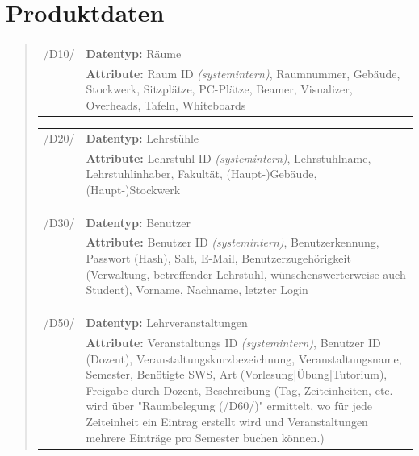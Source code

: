 \section{Produktdaten}
\label{sec:Produktdaten}

\begin{quote}
\begin{tabular}{p{1.5cm}p{14.5cm}}


	 /D10/	& \textbf{Datentyp:} Räume \\
				& \textbf{Attribute:} Raum ID \textsl{(systemintern)}, Raumnummer, Gebäude, Stockwerk, Sitzplätze, PC-Plätze, Beamer, Visualizer, Overheads, Tafeln, Whiteboards  \\[0.25cm]

\end{tabular}


\begin{tabular}{p{1.5cm}p{14.5cm}}
		
	 /D20/	& \textbf{Datentyp:} Lehrstühle \\
				& \textbf{Attribute:} Lehrstuhl ID \textsl{(systemintern)}, Lehrstuhlname, Lehrstuhlinhaber, Fakultät, (Haupt-)Gebäude, (Haupt-)Stockwerk  \\[0.25cm]

\end{tabular}


\begin{tabular}{p{1.5cm}p{14.5cm}}
					
	 /D30/	& \textbf{Datentyp:} Benutzer \\
				& \textbf{Attribute:} Benutzer ID \textsl{(systemintern)}, Benutzerkennung, Passwort (Hash), Salt, E-Mail, Benutzerzugehörigkeit (Verwaltung, betreffender Lehrstuhl, wünschenswerterweise auch Student), Vorname, Nachname, letzter Login  \\[0.25cm]

\end{tabular}


\begin{tabular}{p{1.5cm}p{14.5cm}}
	
	 /D50/	& \textbf{Datentyp:} Lehrveranstaltungen \\
				& \textbf{Attribute:} Veranstaltungs ID \textsl{(systemintern)}, Benutzer ID (Dozent), Veranstaltungskurzbezeichnung, Veranstaltungsname, Semester, Benötigte SWS, Art (Vorlesung|Übung|Tutorium), Freigabe durch Dozent, Beschreibung (Tag, Zeiteinheiten, etc. wird über "Raumbelegung (/D60/)" ermittelt, wo für jede Zeiteinheit ein Eintrag erstellt wird und Veranstaltungen mehrere Einträge pro Semester buchen können.) \\[0.25cm]


\end{tabular}
\end{quote}
